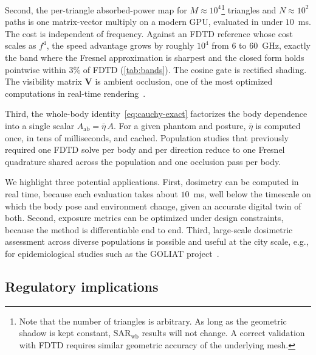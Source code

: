 \documentclass[journal,twocolumn,10pt]{IEEEtran}
\newcommand{\Aab}{A_{\mathrm{ab}}}
\begin{document}
Second, the per-triangle absorbed-power map for $M \approx 10^4$\footnote{Note
that the number of triangles is arbitrary. As long as the geometric shadow is
kept constant, $\mathrm{SAR}_{\mathrm{wb}}$ results will not change. A correct
validation with FDTD requires similar geometric accuracy of the underlying
mesh.}
triangles and $N \approx 10^2$ paths is one matrix-vector multiply on
a modern GPU, evaluated in under $10$~ms. The cost is independent of
frequency. Against an FDTD reference whose cost scales as $f^4$, the
speed advantage grows by roughly $10^4$ from $6$ to $60$~GHz, exactly
the band where the Fresnel approximation is sharpest and the closed
form holds pointwise within $3\%$ of FDTD (\cref{tab:bands}). The
cosine gate is rectified shading. The visibility matrix $\mathbf{V}$
is ambient occlusion, one of the most optimized computations in
real-time rendering~\cite{AkenineMoller2018}.

Third, the whole-body identity~\eqref{eq:cauchy-exact} factorizes the
body dependence into a single scalar $\Aab = \bar\eta\,A$. For a
given phantom and posture, $\bar\eta$ is computed once, in tens of
milliseconds, and cached. Population studies that previously
required one FDTD solve per body and per direction reduce to one
Fresnel quadrature shared across the population and one occlusion
pass per body.

We highlight three potential applications. First, dosimetry can be
computed in real time, because each evaluation takes about $10$~ms,
well below the timescale on which the body pose and environment
change, given an accurate digital twin of both. Second, exposure
metrics can be optimized under design constraints, because the method
is differentiable end to end. Third, large-scale dosimetric assessment
across diverse populations is possible and useful at the city scale,
e.g., for epidemiological studies such as the GOLIAT
project~\cite{Goliat}.

\subsection{Regulatory implications}\label{subsec:disc-regulatory}
\end{document}
